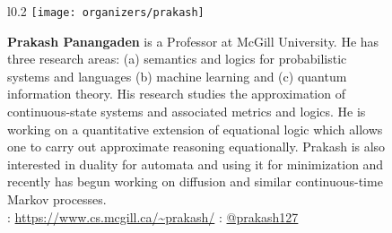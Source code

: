 \documentclass{article}
\begin{document}
    \begin{figure}[H]
        \begin{wrapfigure}{l}{0.2\textwidth}
            \texttt{[image: organizers/prakash]}
        \end{wrapfigure}
        \textbf{Prakash Panangaden} is a Professor at McGill University. He has three research areas: (a) semantics and logics for probabilistic systems and languages (b) machine learning and (c) quantum information theory. His research studies the approximation of continuous-state systems and associated metrics and logics. He is working on a quantitative extension of equational logic which allows one to carry out approximate reasoning equationally. Prakash is also interested in duality for automata and using it for minimization and recently has begun working on diffusion and similar continuous-time Markov processes.\\
        \faHome: \url{https://www.cs.mcgill.ca/~prakash/} \faTwitter: \href{https://twitter.com/prakash127}{@prakash127}
    \end{figure}
\end{document}
